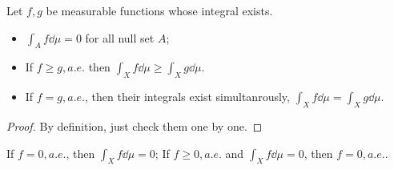 \begin{theorem}
	Let $f,g$ be measurable functions whose integral exists.
    \begin{itemize}
		\item $\int_A f \dd \mu = 0$ for all null set $A$;
		\item If $f\ge g,a.e.$ then $\int_X f\dd \mu \ge \int_X g\dd \mu$.
		\item If $f=g, a.e.$, then their integrals
			exist simultanrously, $\int_X f\dd \mu = \int_X g\dd \mu$.
    \end{itemize}
\end{theorem}
\begin{proof}[Proof]
    By definition, just check them one by one.
\end{proof}

\begin{corollary}
    If $f=0,a.e.$, then $\int_X f\dd \mu = 0$;
	If $f\ge 0, a.e.$ and $\int_X f \dd \mu = 0$, then $f = 0,a.e.$.
\end{corollary}
